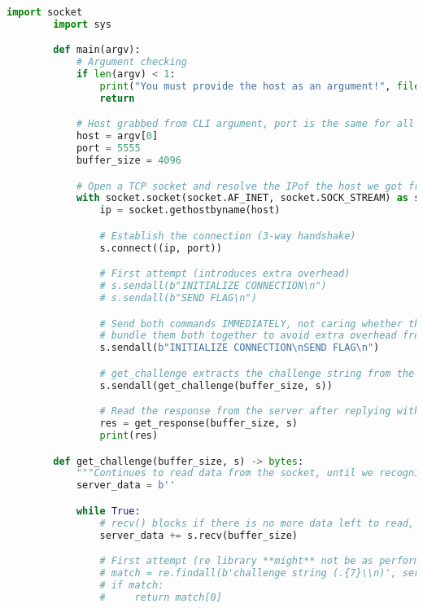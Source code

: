 \documentclass[11pt]{article}
\begin{document}
    \begin{lstlisting}[gobble=8,label={lst:full-code},language=Python,basicstyle={\scriptsize\ttfamily}]
        import socket
        import sys

        def main(argv):
            # Argument checking
            if len(argv) < 1:
                print("You must provide the host as an argument!", file = sys.stderr)
                return

            # Host grabbed from CLI argument, port is the same for all 3 vaults
            host = argv[0]
            port = 5555
            buffer_size = 4096

            # Open a TCP socket and resolve the IPof the host we got from the CLI
            with socket.socket(socket.AF_INET, socket.SOCK_STREAM) as s:
                ip = socket.gethostbyname(host)

                # Establish the connection (3-way handshake)
                s.connect((ip, port))

                # First attempt (introduces extra overhead)
                # s.sendall(b"INITIALIZE CONNECTION\n")
                # s.sendall(b"SEND FLAG\n")

                # Send both commands IMMEDIATELY, not caring whether there is data to read or not
                # bundle them both together to avoid extra overhead from sendall() being called twice
                s.sendall(b"INITIALIZE CONNECTION\nSEND FLAG\n")

                # get_challenge extracts the challenge string from the data the server sent us, and we just send it right back (part of protocol)
                s.sendall(get_challenge(buffer_size, s))

                # Read the response from the server after replying with the challenge string (hopefully we were quick enough!)
                res = get_response(buffer_size, s)
                print(res)

        def get_challenge(buffer_size, s) -> bytes:
            """Continues to read data from the socket, until we recognize the challenge string."""
            server_data = b''

            while True:
                # recv() blocks if there is no more data left to read, and the socket is still open
                server_data += s.recv(buffer_size)

                # First attempt (re library **might** not be as performant as string slicing)
                # match = re.findall(b'challenge string (.{7}\\n)', server_data)
                # if match:
                #     return match[0]


\end{lstlisting}
\end{document}
